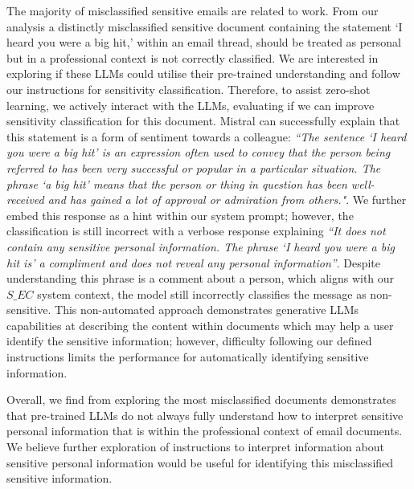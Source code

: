 The majority of misclassified sensitive emails are related to work. From our analysis a distinctly misclassified sensitive document containing the statement ‘I heard you were a big hit,’ within an email thread, should be treated as personal but in a professional context is not correctly classified. We are interested in exploring if these LLMs could utilise their pre-trained understanding and follow our instructions for sensitivity classification. Therefore, to assist zero-shot learning, we actively interact with the LLMs, evaluating if we can improve sensitivity classification for this document. Mistral can successfully explain that this statement is a form of sentiment towards a colleague: \textit{``The sentence `I heard you were a big hit' is an expression often used to convey that the person being referred to has been very successful or popular in a particular situation. The phrase `a big hit' means that the person or thing in question has been well-received and has gained a lot of approval or admiration from others."}. We further embed this response as a hint within our system prompt; however, the classification is still incorrect with a verbose response explaining \textit{``It does not contain any sensitive personal information. The phrase `I heard you were a big hit is' a compliment and does not reveal any personal information”}. Despite understanding this phrase is a comment about a person, which aligns with our $S\_EC$ system context, the model still incorrectly classifies the message as non-sensitive. This non-automated approach demonstrates generative LLMs capabilities at describing the content within documents which may help a user identify the sensitive information; however, difficulty following our defined instructions limits the performance for automatically identifying sensitive information.

Overall, we find from exploring the most misclassified documents demonstrates that pre-trained LLMs do not always fully understand how to interpret sensitive personal information that is within the professional context of email documents. We believe further exploration of instructions to interpret information about sensitive personal information would be useful for identifying this misclassified sensitive information.

